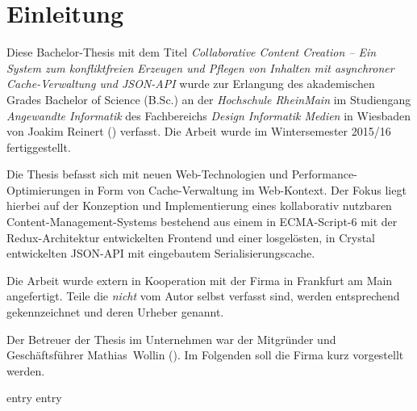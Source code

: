 \chapter{Einleitung}
\label{chap:einleitung}

Diese Bachelor-Thesis mit dem Titel \emph{Collaborative Content Creation -- Ein
System zum konfliktfreien Erzeugen und Pflegen von Inhalten mit asynchroner
Cache-Verwaltung und JSON-API} wurde zur Erlangung des akademischen Grades
Bachelor of Science (B.Sc.) an der \emph{Hochschule RheinMain} im Studiengang
\emph{Angewandte Informatik} des Fachbereichs \emph{Design Informatik Medien}
in Wiesbaden von Joakim Reinert () verfasst.  Die
Arbeit wurde im Wintersemester 2015/16 fertiggestellt.

Die Thesis befasst sich mit neuen Web-Technologien und
Performance-Optimierungen in Form von Cache-Verwaltung im Web-Kontext.  Der
Fokus liegt hierbei auf der Konzeption und Implementierung eines kollaborativ
nutzbaren Content-Management-Systems bestehend aus einem in ECMA-Script-6 mit
der Redux-Architektur entwickelten Frontend und einer losgelösten, in Crystal
entwickelten JSON-API mit eingebautem Serialisierungscache.

Die Arbeit wurde extern in Kooperation mit der Firma \emph{\mesods} in
Frankfurt am Main angefertigt.  Teile die \emph{nicht} vom Autor selbst
verfasst sind, werden entsprechend gekennzeichnet und deren Urheber genannt.

Der Betreuer der Thesis im Unternehmen war der Mitgründer und Geschäftsführer
\mbox{Mathias Wollin} ().  Im Folgenden soll die Firma
kurz vorgestellt werden.

{entry}
{entry}

